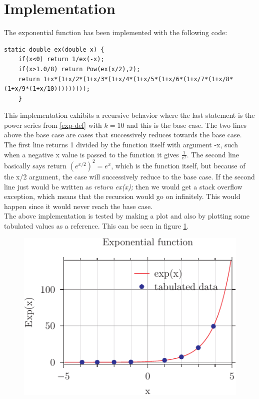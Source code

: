 \documentclass[twocolumn, a4paper]{article}
\begin{document}
\section*{Implementation}
The exponential function has been implemented with the following code:
\begin{lstlisting}
static double ex(double x) {
	if(x<0) return 1/ex(-x);
	if(x>1.0/8) return Pow(ex(x/2),2);
	return 1+x*(1+x/2*(1+x/3*(1+x/4*(1+x/5*(1+x/6*(1+x/7*(1+x/8*(1+x/9*(1+x/10)))))))));
	}
\end{lstlisting}
This implementation exhibits a recursive behavior where the last statement is the power series from \eqref{exp-def} with $k=10$ and this is the base case. The two lines above the base case are cases that successively reduces towards the base case. The first line returns 1 divided by the function itself with argument -x, such when a negative x value is passed to the function it gives $\frac{1}{\textit{e}^x}$. The second line basically says return $\left(\textit{e}^{x/2}\right)^2 = \textit{e}^x$, which is the function itself, but because of the x/2 argument, the case will successively reduce to the base case. If the second line just would be written as \textit{return ex(x);} then we would get a stack overflow exception, which means that the recursion would go on infinitely. This would happen since it would never reach the base case.\\
The above implementation is tested by making a plot and also by plotting some tabulated values as a reference. This can be seen in figure \ref{exp-graph}.
\begin{figure}[!h]
	\includegraphics{exp_pyx.pdf}
	\label{exp-graph}
\end{figure}
\end{document}
